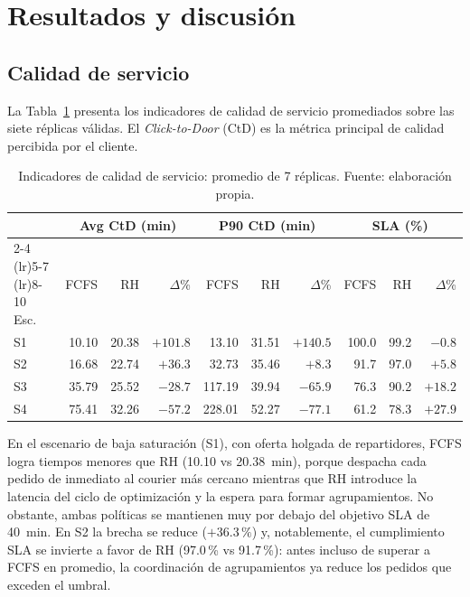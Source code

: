 \documentclass[12pt,letterpaper]{article}
\begin{document}
\section{Resultados y discusión}

\subsection{Calidad de servicio}

La Tabla~\ref{tab:res_ctd} presenta los indicadores de calidad de servicio
promediados sobre las siete réplicas válidas. El \textit{Click-to-Door} (CtD) es
la métrica principal de calidad percibida por el cliente.

\begin{table}[htbp]
\centering
\small
\caption{Indicadores de calidad de servicio: promedio de 7 réplicas. Fuente:
elaboración propia.}
\label{tab:res_ctd}
\begin{tabular}{@{}l rr r rr r rr r@{}}
\toprule
& \multicolumn{3}{c}{Avg CtD (min)} & \multicolumn{3}{c}{P90 CtD (min)} & \multicolumn{3}{c}{SLA (\%)} \\
\cmidrule(lr){2-4} \cmidrule(lr){5-7} \cmidrule(lr){8-10}
Esc. & FCFS & RH & $\Delta$\% & FCFS & RH & $\Delta$\% & FCFS & RH & $\Delta$\% \\
\midrule
S1 & 10.10 & 20.38 & $+101.8$ & 13.10  & 31.51 & $+140.5$ & 100.0 & 99.2 & $-0.8$  \\
S2 & 16.68 & 22.74 & $+36.3$  & 32.73  & 35.46 & $+8.3$   & 91.7  & 97.0 & $+5.8$  \\
S3 & 35.79 & 25.52 & $-28.7$  & 117.19 & 39.94 & $-65.9$  & 76.3  & 90.2 & $+18.2$ \\
S4 & 75.41 & 32.26 & $-57.2$  & 228.01 & 52.27 & $-77.1$  & 61.2  & 78.3 & $+27.9$ \\
\bottomrule
\end{tabular}
\end{table}

En el escenario de baja saturación (S1), con oferta holgada de repartidores, FCFS
logra tiempos menores que RH (10.10 vs 20.38~min), porque despacha cada pedido de
inmediato al courier más cercano mientras que RH introduce la latencia del ciclo
de optimización y la espera para formar agrupamientos. No obstante, ambas
políticas se mantienen muy por debajo del objetivo SLA de 40~min. En S2 la brecha
se reduce ($+36.3\,\%$) y, notablemente, el cumplimiento SLA se invierte a favor de
RH (97.0\,\% vs 91.7\,\%): antes incluso de superar a FCFS en promedio, la
coordinación de agrupamientos ya reduce los pedidos que exceden el umbral.
\end{document}
